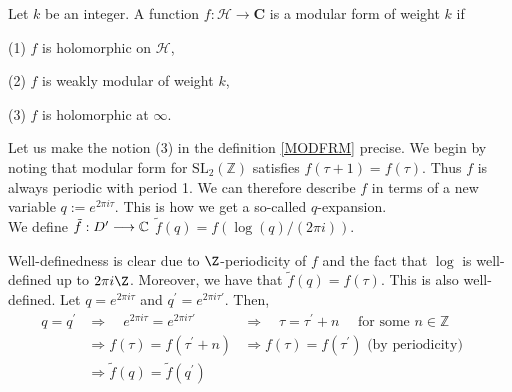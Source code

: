 \begin{definition}\label{MODFRM}
    Let $k$ be an integer. A function $f: \mathcal{H} \longrightarrow \mathbf{C}$ is a modular form of weight $k$ if

(1) $f$ is holomorphic on $\mathcal{H}$,

(2) $f$ is weakly modular of weight $k$,

(3) $f$ is holomorphic at $\infty$.

\end{definition}

\begin{remark}
Let us make the notion (3) in the definition \ref{MODFRM} precise. We begin by noting that modular form for $\mathrm{SL}_{2}(\mathbb{Z})$ satisfies $f(\tau+1)=f(\tau)$. Thus $f$ is always periodic with period 1. We can therefore describe $f$ in terms of a new variable $q:=e^{2 \pi i \tau}$. This is how we get a so-called $q$-expansion. \\
We define $\Tilde{f}: D^{\prime} \longrightarrow \mathbb{C}$ $\tilde{f}(q)=f(\log (q) /(2 \pi i))$.  

Well-definedness is clear due to $\Z$-periodicity of $f$ and the fact that $\operatorname{log}$ is well-defined up to $2 \pi i \Z$. Moreover, we have that $\tilde{f}(q)=f(\tau)$. This is also well-defined.
Let $q=e^{2 \pi i \tau}$ and $q^{\prime}=e^{2 \pi i \tau'}$. 
Then,
$$
\begin{array}{rllll}
q=q^{\prime} & \Longrightarrow \quad e^{2 \pi i \tau}=e^{2 \pi i \tau'} & \Longrightarrow \quad \tau=\tau^{\prime}+n \quad \text { for some } n \in \mathbb{Z} \\
& \Longrightarrow f(\tau)=f\left(\tau^{\prime}+n\right) & \Longrightarrow f(\tau)=f\left(\tau^{\prime}\right) \text { (by periodicity) } \\
& \Longrightarrow \tilde{f}(q)=\tilde{f}\left(q^{\prime}\right) & &
\end{array}
$$


\end{remark}
